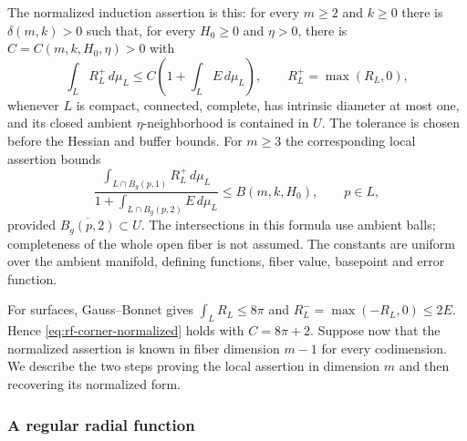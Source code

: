 The normalized induction assertion is this: for every $m\geq2$ and
$k\geq0$ there is $\delta(m,k)>0$ such that, for every $H_0\geq0$ and
$\eta>0$, there is $C=C(m,k,H_0,\eta)>0$ with
\begin{equation}\label{eq:rf-corner-normalized}
       \int_L R_L^+\,d\mu_L\leq C\left(1+\int_LE\,d\mu_L\right),
       \qquad R_L^+=\max(R_L,0),
\end{equation}
whenever $L$ is compact, connected, complete, has intrinsic diameter
at most one, and its closed ambient $\eta$-neighborhood is contained
in $U$.  The tolerance is chosen before the Hessian and buffer bounds.
For $m\geq3$ the corresponding local assertion bounds
\begin{equation}\label{eq:rf-corner-local}
 \frac{\int_{L\cap B_g(p,1)}R_L^+\,d\mu_L}
      {1+\int_{L\cap B_g(p,2)}E\,d\mu_L}\leq B(m,k,H_0),
 \qquad p\in L,
\end{equation}
provided $\overline{B_g(p,2)}\subset U$.  The intersections in this
formula use ambient balls; completeness of the whole open fiber is
not assumed.  The constants are uniform over the ambient manifold,
defining functions, fiber value, basepoint and error function.

For surfaces, Gauss--Bonnet gives
$\int_LR_L\leq8\pi$ and $R_L^-=\max(-R_L,0)\leq2E$.
Hence \eqref{eq:rf-corner-normalized} holds with $C=8\pi+2$.
Suppose now that the normalized assertion is known in fiber dimension
$m-1$ for every codimension.  We describe the two steps proving the
local assertion in dimension $m$ and then recovering its normalized
form.

\subsubsection{A regular radial function}


